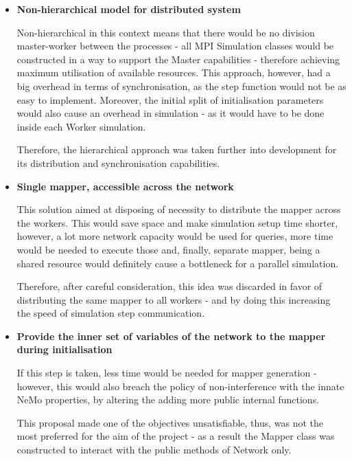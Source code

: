 \begin{itemize}

\item{\textbf{Non-hierarchical model for distributed system}}

Non-hierarchical in this context means that there would be no division master-worker between the processes - all MPI Simulation classes would be constructed in a way to support the Master capabilities - therefore achieving maximum utilisation of available resources. This approach, however, had a big overhead in terms of synchronisation, as the step function would not be as easy to implement. Moreover, the initial split of initialisation parameters would also cause an overhead in simulation - as it would have to be done inside each Worker simulation.

Therefore, the hierarchical approach was taken further into development for its distribution and synchronisation capabilities.

\item{\textbf{Single mapper, accessible across the network}}

This solution aimed at disposing of necessity to distribute the mapper across the workers. This would save space and make simulation setup time shorter, however, a lot more network capacity would be used for queries, more time would be needed to execute those and, finally, separate mapper, being a shared resource would definitely cause a bottleneck for a parallel simulation.

Therefore, after careful consideration, this idea was discarded in favor of distributing the same mapper to all workers - and by doing this increasing the speed of simulation step communication.

\item{\textbf{Provide the inner set of variables of the network to the mapper during initialisation}}

If this step is taken, less time would be needed for mapper generation - however, this would also breach the policy of non-interference with the innate NeMo properties, by altering the adding more public internal functions.

This proposal made one of the objectives unsatisfiable, thus, was not the most preferred for the aim of the project - as a result the Mapper class was constructed to interact with the public methods of Network only.

\end{itemize}

